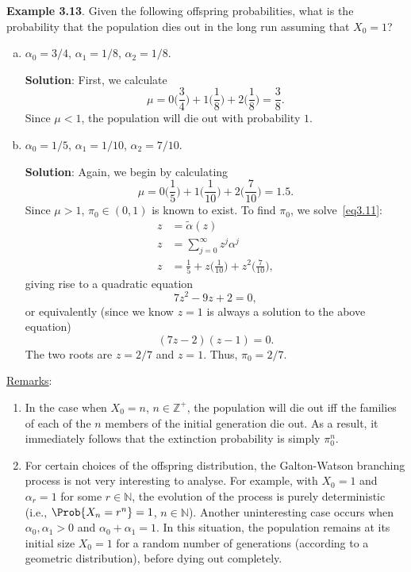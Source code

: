 \begin{Example}
      \textbf{Example 3.13}. Given the following offspring probabilities, what is the probability that the
      population dies out in the long run assuming that $ X_0=1 $?
      \begin{enumerate}[(a)]
            \item $ \alpha_0=3/4 $, $ \alpha_1=1/8 $, $ \alpha_2=1/8 $.

                  \textbf{Solution}: First, we calculate
                  \[ \mu=0\biggl(\frac{3}{4}\biggr)+1\biggl(\frac{1}{8}\biggr)+2\biggl(\frac{1}{8}\biggr)=\frac{3}{8}.  \]
                  Since $ \mu<1 $, the population will die out with probability $ 1 $.
            \item $ \alpha_0=1/5 $, $ \alpha_1=1/10 $, $ \alpha_2=7/10 $.

                  \textbf{Solution}: Again, we begin by calculating
                  \[ \mu=0\biggl(\frac{1}{5}\biggr)+1\biggl(\frac{1}{10}\biggr)+2\biggl(\frac{7}{10}\biggr)=1.5. \]
                  Since $ \mu>1 $, $ \pi_0\in(0,1) $ is known to exist. To find $ \pi_0 $, we solve~\ref{eq3.11}:
                  \begin{align*}
                        z & =\tilde{\alpha}(z)                                                       \\
                        z & =\sum_{j=0}^{\infty} z^j \alpha^j                                        \\
                        z & =\frac{1}{5} +z\biggl(\frac{1}{10}\biggr)+z^2\biggl(\frac{7}{10}\biggr),
                  \end{align*}
                  giving rise to a quadratic equation
                  \[ 7z^2-9z+2=0, \]
                  or equivalently (since we know $ z=1 $ is always a solution to the above equation)
                  \[ (7z-2)(z-1)=0. \]
                  The two roots are $ z=2/7 $ and $ z=1 $. Thus, $ \pi_0=2/7 $.
      \end{enumerate}
\end{Example}
\noindent\underline{Remarks}:
\begin{enumerate}[(1)]
      \item In the case when $ X_0=n $, $ n\in\mathbb{Z}^+ $, the population will die out iff the families of each of
            the $n$ members of the initial generation die out. As a result, it immediately follows that
            the extinction probability is simply $ \pi_0^n $.
      \item For certain choices of the offspring distribution, the Galton-Watson branching process is
            not very interesting to analyse. For example, with $ X_0=1 $ and $ \alpha_r=1 $ for some $ r\in\mathbb{N} $,
            the evolution of the process is purely deterministic (i.e., $ \Prob{X_n=r^n}=1 $, $ n\in\mathbb{N} $). Another
            uninteresting case occurs when $ \alpha_0,\alpha_1>0 $ and $ \alpha_0+\alpha_1=1 $. In this situation, the
            population remains at its initial size $ X_0=1 $ for a random number of generations
            (according to a geometric distribution), before dying out completely.
\end{enumerate}
